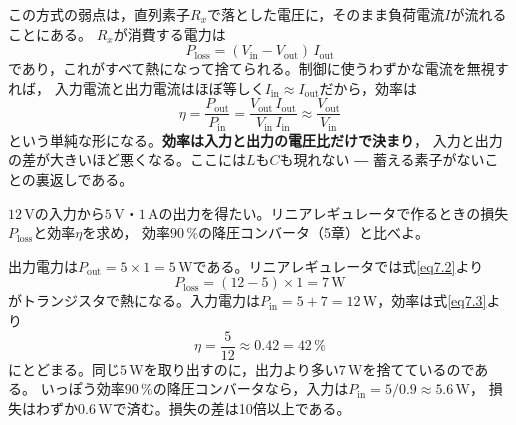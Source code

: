 この方式の弱点は，直列素子$R_x$で落とした電圧に，そのまま負荷電流$I$が流れることにある。
$R_x$が消費する電力は
\begin{equation}
P_{\mathrm{loss}} = (V_{\mathrm{in}} - V_{\mathrm{out}})\, I_{\mathrm{out}}
\label{eq7.2}
\end{equation}
であり，これがすべて熱になって捨てられる。制御に使うわずかな電流を無視すれば，
入力電流と出力電流はほぼ等しく$I_{\mathrm{in}} \approx I_{\mathrm{out}}$だから，効率は
\begin{equation}
\eta = \frac{P_{\mathrm{out}}}{P_{\mathrm{in}}}
= \frac{V_{\mathrm{out}}\, I_{\mathrm{out}}}{V_{\mathrm{in}}\, I_{\mathrm{in}}}
\approx \frac{V_{\mathrm{out}}}{V_{\mathrm{in}}}
\label{eq7.3}
\end{equation}
という単純な形になる。\textbf{効率は入力と出力の電圧比だけで決まり}，
入力と出力の差が大きいほど悪くなる。ここには$L$も$C$も現れない ― 蓄える素子がないことの裏返しである。

\begin{例題}[効率 ― スイッチング方式との対比]
\label{rei7.1}
$12$\,Vの入力から$5$\,V・$1$\,Aの出力を得たい。リニアレギュレータで作るときの損失$P_{\mathrm{loss}}$と効率$\eta$を求め，
効率$90\,\%$の降圧コンバータ（5章）と比べよ。
\begin{解答}
出力電力は$P_{\mathrm{out}} = 5 \times 1 = 5$\,Wである。リニアレギュレータでは式\ref{eq7.2}より
\begin{equation*}
P_{\mathrm{loss}} = (12 - 5) \times 1 = 7\,\mathrm{W}
\end{equation*}
がトランジスタで熱になる。入力電力は$P_{\mathrm{in}} = 5 + 7 = 12$\,W，効率は式\ref{eq7.3}より
\begin{equation*}
\eta = \frac{5}{12} \approx 0.42 = 42\,\%
\end{equation*}
にとどまる。同じ$5$\,Wを取り出すのに，出力より多い$7$\,Wを捨てているのである。
いっぽう効率$90\,\%$の降圧コンバータなら，入力は$P_{\mathrm{in}} = 5/0.9 \approx 5.6$\,W，
損失はわずか$0.6$\,Wで済む。損失の差は10倍以上である。
\end{解答}
\end{例題}


